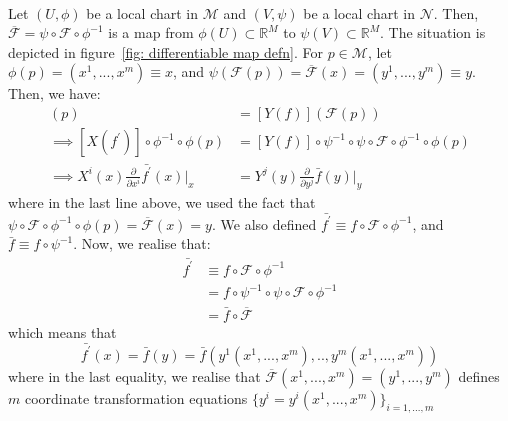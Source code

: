       \begin{corollary}
        \label{corollary: f-related field calculation}
        \mbox{} \\
        Let $(U,\phi)$ be a local chart in $\mathcal{M}$ and $(V,
        \psi)$ be a local chart in $\mathcal{N}$. Then,
        $\overline{\mathcal{F}} = \psi\circ\mathcal{F}\circ \phi^{-1}$
        is a map from $\phi(U) \subset \mathbb{R}^M$ to $\psi(V)
        \subset \mathbb{R}^M$. The situation is depicted in
        figure~\ref{fig: differentiable map defn}. For $p \in
        \mathcal{M}$, let $\phi(p) = (x^1,...,x^m)\equiv x$, and
        $\psi\left(\mathcal{F}(p)\right) = \overline{\mathcal{F}}(x) =
        (y^1,...,y^m) \equiv y$.
        Then, we have:
        \begin{align}
          [X\big( \mspace{-10mu} \underbrace{f \circ \mathcal{F}}_{\substack{\equiv
          f^\prime,  \\ f^\prime\in C^k(\mathcal{M})}}
          \mspace{-10mu}\big)](p) &=
          [Y(f)]\left(\mathcal{F}(p)\right) \nonumber \\
          \implies [X(f^\prime)]\circ \phi^{-1} \circ \phi(p) &=
          [Y(f)]\circ \psi^{-1} \circ \psi \circ
          \mathcal{F}\circ\phi^{-1}\circ\phi(p) \nonumber \\
          \implies X^i(x)\frac{\partial }{\partial
          x^i}\bar{f^\prime}(x)\biggr|_x &=
          Y^j(y)\frac{\partial}{\partial y^j} \bar{f}(y)\biggr|_y \nonumber
        \end{align}
        where in the last line above, we used the fact that $\psi \circ
        \mathcal{F}\circ\phi^{-1}\circ\phi(p) =
        \overline{\mathcal{F}}(x) = y$. We also defined $\bar{f^\prime}
        \equiv f \circ \mathcal{F} \circ \phi^{-1}$, and $\bar{f}
        \equiv f \circ \psi^{-1}$. Now, we realise that:
        \begin{align*}
          \bar{f^\prime} &\equiv f \circ \mathcal{F} \circ \phi^{-1} \\
          &= f \circ \psi^{-1} \circ \psi \circ \mathcal{F} \circ
          \phi^{-1} \\
          &= \bar{f} \circ \overline{\mathcal{F}}
        \end{align*}
        which means that \[\bar{f^\prime}(x) = \bar{f}(y) =
        \bar{f}(y^1(x^1,...,x^m),..,y^m(x^1,...,x^m))\] where in the
        last equality, we realise that
        $\overline{\mathcal{F}}(x^1,...,x^m) = (y^1,...,y^m)$ defines
        $m$ coordinate transformation equations $\{y^i =
        y^i(x^1,...,x^m)\}_{i = 1,...,m}$


\end{corollary}
